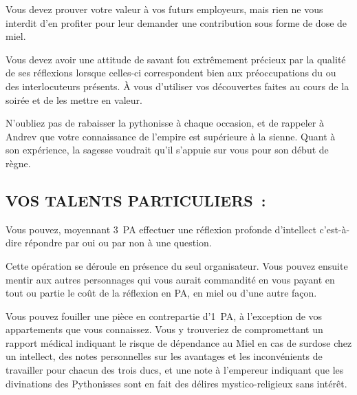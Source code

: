 \documentclass[14pt,twocolumn]{extarticle}
\begin{document}
Vous devez prouver votre valeur à vos futurs employeurs, mais rien ne vous
interdit d'en profiter pour leur demander une contribution sous forme de dose
de miel.

Vous devez avoir une attitude de savant fou extrêmement précieux par la qualité
de ses réflexions lorsque celles-ci correspondent bien aux préoccupations du ou
des interlocuteurs présents. À vous d'utiliser vos découvertes faites au cours
de la soirée et de les mettre en valeur.

N'oubliez pas de rabaisser la pythonisse à chaque occasion, et de rappeler à
Andrev que votre connaissance de l'empire est supérieure à la sienne. Quant à
son expérience, la sagesse voudrait qu'il s'appuie sur vous pour son début de
règne.

\subsection{VOS TALENTS PARTICULIERS~:}

Vous pouvez, moyennant 3~PA effectuer une réflexion profonde d'intellect
c'est-à-dire répondre par oui ou par non à une question.

Cette opération se déroule en présence du seul organisateur. Vous pouvez
ensuite mentir aux autres personnages qui vous aurait commandité en vous
payant en tout ou partie le coût de la réflexion en PA, en miel ou d'une autre
façon.

Vous pouvez fouiller une pièce en contrepartie d'1~PA, à l'exception de vos
appartements que vous connaissez. Vous y trouveriez de compromettant un rapport
médical indiquant le risque de dépendance au Miel en cas de surdose chez un
intellect, des notes personnelles sur les avantages et les inconvénients de
travailler pour chacun des trois ducs, et une note à l’empereur indiquant que
les divinations des Pythonisses sont en fait des délires mystico-religieux sans
intérêt.
\end{document}
